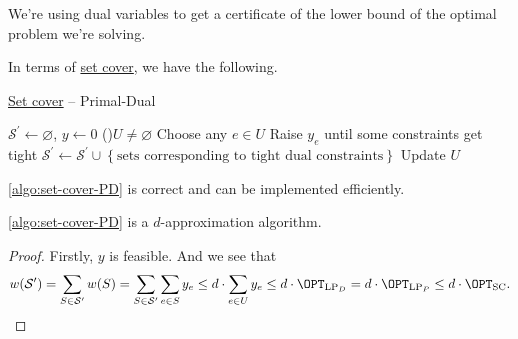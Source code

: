 \begin{remark}
	We're using dual variables to get a certificate of the lower bound of the optimal problem we're solving.
\end{remark}

In terms of \hyperref[prb:set-cover]{set cover}, we have the following.

\begin{algorithm}[H]\label{algo:set-cover-PD}
	\DontPrintSemicolon
	\caption{\hyperref[prb:set-cover]{Set cover} -- Primal-Dual}
	\BlankLine

	\(\mathcal{S} ^\prime \gets \varnothing\), \(y \gets 0\)\;
	\While(){\(U \neq \varnothing \)}{
		Choose any \(e\in U\)\;
		Raise \(y_e\) until some constraints get tight\;
		\(\mathcal{S} ^\prime \gets \mathcal{S} ^\prime \cup \left\{ \text{sets corresponding to tight dual constraints} \right\} \)\;
		Update \(U\)
	}
	\;
\end{algorithm}

\begin{remark}
	\autoref{algo:set-cover-PD} is correct and can be implemented efficiently.
\end{remark}

\begin{theorem}
	\autoref{algo:set-cover-PD} is a \(d\)-approximation algorithm.
\end{theorem}
\begin{proof}
	Firstly, \(y\) is feasible. And we see that
	\[
		w(\mathcal{S} ^\prime ) = \sum_{S\in \mathcal{S} ^\prime } w(S) = \sum_{S\in \mathcal{S} ^\prime }\sum_{e\in S}y_e \leq d\cdot \sum_{e\in U} y_e \leq d\cdot \OPT_{\mathrm{LP}_{D}} = d\cdot \OPT_{\mathrm{LP}_P}\leq d\cdot \OPT_{\mathrm{SC} }.
	\]
\end{proof}